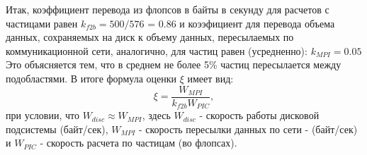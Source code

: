 Итак, коэффициент перевода из флопсов в байты в секунду для расчетов с частицами равен
$k_{f2b} = 500/576$ = 0.86   
и коээфициент для перевода объема данных, сохраняемых на диск к объему данных, пересылаемых по коммуникационной сети, аналогично, для частиц равен (усредненно):
$k_{MPI} = 0.05$ 
Это объясняется тем, что в среднем не более 5\% частиц пересылается между подобластями.
В итоге формула оценки $\xi$ имеет вид:
$$
\xi = \frac{W_{MPI}} {k_{f2b} W_{PIC}}, 
$$
при условии, что $W_{disc} \approx W_{MPI}$,
здесь $W_{disc}$ - скорость работы дисковой подсистемы (байт/сек), $W_{MPI}$
- скорость пересылки данных по сети - (байт/сек) и $W_{PIC}$ - скорость расчета по частицам (во флопсах).	


